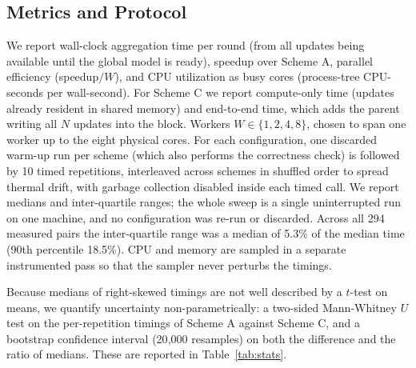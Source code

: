\documentclass[conference]{IEEEtran}
\begin{document}
\begin{table}[t]
\caption{Hardware and Software Environment}
\label{tab:env}
\centering
\footnotesize
{}
\end{table}

\subsection{Metrics and Protocol}
We report wall-clock aggregation time per round (from all updates being available until the global model is ready), speedup over Scheme A, parallel efficiency (speedup$/W$), and CPU utilization as busy cores (process-tree CPU-seconds per wall-second). For Scheme C we report compute-only time (updates already resident in shared memory) and end-to-end time, which adds the parent writing all $N$ updates into the block. Workers $W\in\{1,2,4,8\}$, chosen to span one worker up to the eight physical cores. For each configuration, one discarded warm-up run per scheme (which also performs the correctness check) is followed by 10 timed repetitions, interleaved across schemes in shuffled order to spread thermal drift, with garbage collection disabled inside each timed call. We report medians and inter-quartile ranges; the whole sweep is a single uninterrupted run on one machine, and no configuration was re-run or discarded. Across all 294 measured pairs the inter-quartile range was a median of 5.3\% of the median time (90th percentile 18.5\%). CPU and memory are sampled in a separate instrumented pass so that the sampler never perturbs the timings.

Because medians of right-skewed timings are not well described by a $t$-test on means, we quantify uncertainty non-parametrically: a two-sided Mann-Whitney $U$ test on the per-repetition timings of Scheme A against Scheme C, and a bootstrap confidence interval (20{,}000 resamples) on both the difference and the ratio of medians. These are reported in Table~\ref{tab:stats}.
\end{document}
